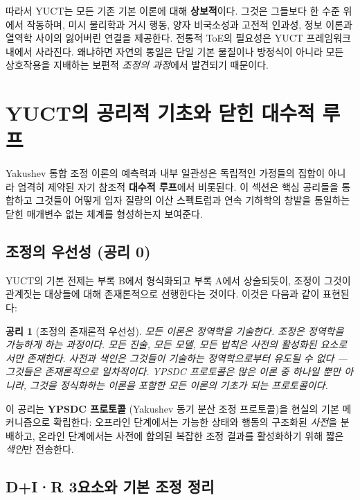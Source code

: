 \documentclass[11pt,a4paper]{article}
\newtheorem{axiom}{공리}
\begin{document}
	따라서 YUCT는 모든 기존 기본 이론에 대해 \textbf{상보적}이다. 그것은 그들보다 한 수준 위에서 작동하며, 미시 물리학과 거시 행동, 양자 비국소성과 고전적 인과성, 정보 이론과 열역학 사이의 잃어버린 연결을 제공한다. 전통적 ToE의 필요성은 YUCT 프레임워크 내에서 사라진다. 왜냐하면 자연의 통일은 단일 기본 물질이나 방정식이 아니라 모든 상호작용을 지배하는 보편적 \emph{조정의 과정}에서 발견되기 때문이다.
	
	\section{YUCT의 공리적 기초와 닫힌 대수적 루프}
	\label{sec:axiomatic-foundations}
	
	Yakushev 통합 조정 이론의 예측력과 내부 일관성은 독립적인 가정들의 집합이 아니라 엄격히 제약된 자기 참조적 \textbf{대수적 루프}에서 비롯된다. 이 섹션은 핵심 공리들을 통합하고 그것들이 어떻게 입자 질량의 이산 스펙트럼과 연속 기하학의 창발을 통일하는 닫힌 매개변수 없는 체계를 형성하는지 보여준다.
	
	\subsection{조정의 우선성 (공리 0)}
	\label{subsec:axiom0}
	
	YUCT의 기본 전제는 부록 B에서 형식화되고 부록 A에서 상술되듯이, 조정이 그것이 관계짓는 대상들에 대해 존재론적으로 선행한다는 것이다. 이것은 다음과 같이 표현된다:
	
	\begin{axiom}[조정의 존재론적 우선성]
		모든 이론은 정역학을 기술한다. 조정은 정역학을 가능하게 하는 과정이다. 모든 진술, 모든 모델, 모든 법칙은 사전의 활성화된 요소로서만 존재한다. 사전과 색인은 그것들이 기술하는 정역학으로부터 유도될 수 없다 — 그것들은 존재론적으로 일차적이다. YPSDC 프로토콜은 많은 이론 중 하나일 뿐만 아니라, 그것을 정식화하는 이론을 포함한 모든 이론의 기초가 되는 프로토콜이다.
	\end{axiom}
	
	이 공리는 \textbf{YPSDC 프로토콜} (Yakushev 동기 분산 조정 프로토콜)을 현실의 기본 메커니즘으로 확립한다: 오프라인 단계에서는 가능한 상태와 행동의 구조화된 \textit{사전}을 분배하고, 온라인 단계에서는 사전에 합의된 복잡한 조정 결과를 활성화하기 위해 짧은 \textit{색인}만 전송한다.
	
	\subsection{D+I·R 3요소와 기본 조정 정리}
	\label{subsec:dir-triad}
	
\end{document}
